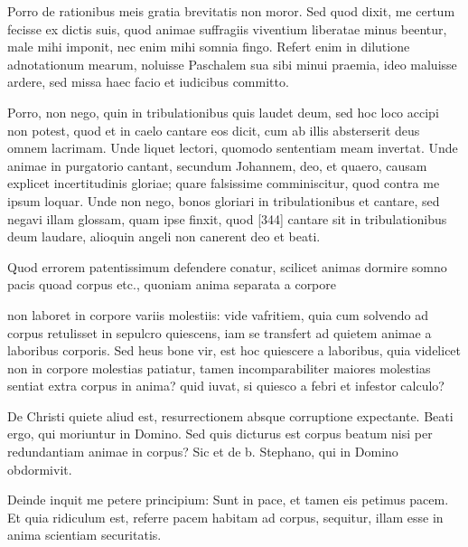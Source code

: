 Porro de rationibus meis gratia brevitatis non moror. Sed quod dixit, me certum fecisse ex dictis suis, quod animae suffragiis viventium liberatae minus beentur, male mihi imponit, nec enim mihi somnia fingo. Refert enim in dilutione adnotationum mearum, noluisse Paschalem sua sibi minui praemia, ideo maluisse ardere, sed missa haec facio et iudicibus committo.

Porro, non nego, quin in tribulationibus quis laudet deum, sed hoc loco accipi non potest, quod et in caelo cantare eos dicit, cum ab illis absterserit deus omnem lacrimam. Unde liquet lectori, quomodo sententiam meam invertat. Unde animae in purgatorio cantant, secundum Johannem, deo, et quaero, causam explicet incertitudinis gloriae; quare falsissime comminiscitur, quod contra me ipsum loquar. Unde non nego, bonos gloriari in tribulationibus et cantare, sed negavi illam glossam, quam ipse finxit, quod [344] cantare sit in tribulationibus deum laudare, alioquin angeli non canerent deo et beati.

Quod errorem patentissimum defendere conatur, scilicet animas dormire somno pacis quoad corpus etc., quoniam anima separata a corpore

non laboret in corpore variis molestiis: vide vafritiem, quia cum solvendo ad corpus retulisset in sepulcro quiescens, iam se transfert ad quietem animae a laboribus corporis. Sed heus bone vir, est hoc quiescere a laboribus, quia videlicet non in corpore molestias patiatur, tamen incomparabiliter maiores molestias sentiat extra corpus in anima? quid iuvat, si quiesco a febri et infestor calculo?

De Christi quiete aliud est, resurrectionem absque corruptione expectante. Beati ergo, qui moriuntur in Domino. Sed quis dicturus est corpus beatum nisi per redundantiam animae in corpus? Sic et de b. Stephano, qui in Domino obdormivit.

Deinde inquit me petere principium: Sunt in pace, et tamen eis petimus pacem. Et quia ridiculum est, referre pacem habitam ad corpus, sequitur, illam esse in anima scientiam securitatis.


